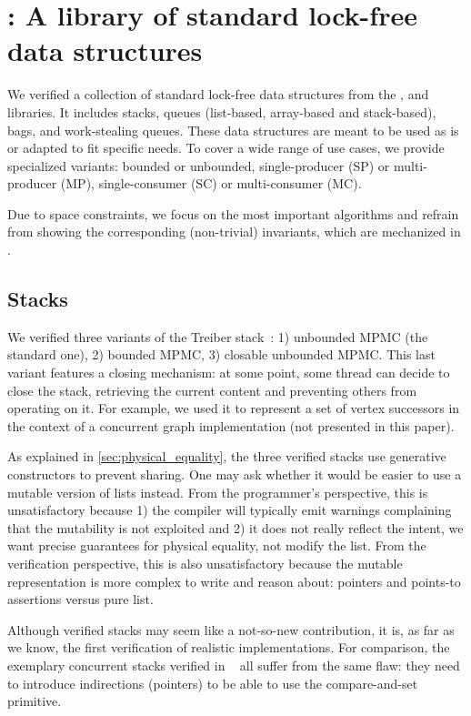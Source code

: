 \section{\Saturn: A library of standard lock-free data structures}
\label{sec:saturn}

We verified a collection of standard lock-free data structures from the \Saturn, \Eio and \Picos~\citep*{picos} libraries.
It includes stacks, queues (list-based, array-based and stack-based), bags, and work-stealing queues.
These data structures are meant to be used as is or adapted to fit specific needs.
To cover a wide range of use cases, we provide specialized variants: bounded or unbounded, single-producer (SP) or multi-producer (MP), single-consumer (SC) or multi-consumer (MC).

Due to space constraints, we focus on the most important algorithms and refrain from showing the corresponding (non-trivial) \Iris invariants, which are mechanized in \Rocq.

\subsection{Stacks}

We verified three variants of the Treiber stack~\citep*{thomas1986systems}: 1) unbounded MPMC (the standard one), 2) bounded MPMC, 3) closable unbounded MPMC.
This last variant features a closing mechanism: at some point, some thread can decide to close the stack, retrieving the current content and preventing others from operating on it.
For example, we used it to represent a set of vertex successors in the context of a concurrent graph implementation (not presented in this paper).

As explained in \cref{sec:physical_equality}, the three verified stacks use generative constructors to prevent sharing.
One may ask whether it would be easier to use a mutable version of lists instead.
From the programmer's perspective, this is unsatisfactory because 1) the compiler will typically emit warnings complaining that the mutability is not exploited and 2) it does not really reflect the intent, \ie we want precise guarantees for physical equality, not modify the list.
From the verification perspective, this is also unsatisfactory because the mutable representation is more complex to write and reason about: pointers and points-to assertions versus pure \Rocq list.

Although verified stacks may seem like a not-so-new contribution, it is, as far as we know, the first verification of realistic \OCaml implementations.
For comparison, the exemplary concurrent stacks verified in \Iris~\citep*{iris-examples} all suffer from the same flaw: they need to introduce indirections (pointers) to be able to use the compare-and-set primitive.

